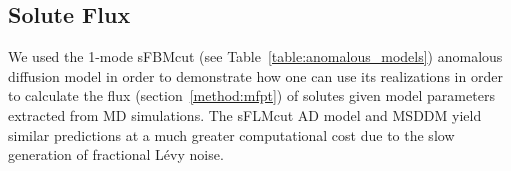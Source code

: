 \documentclass{article}
\begin{document}
%  
  
  \subsection{Solute Flux}\label{section:mfpt}
  
  We used the 1-mode sFBMcut (see Table~\ref{table:anomalous_models}) anomalous 
  diffusion model in order to demonstrate how one can use its realizations in
  order to calculate the flux (section~\ref{method:mfpt}) of solutes given model 
  parameters extracted from MD simulations. The sFLMcut AD model and MSDDM yield 
  similar predictions at a much greater computational cost due to the slow
  generation of fractional L\'evy noise.
\end{document}
